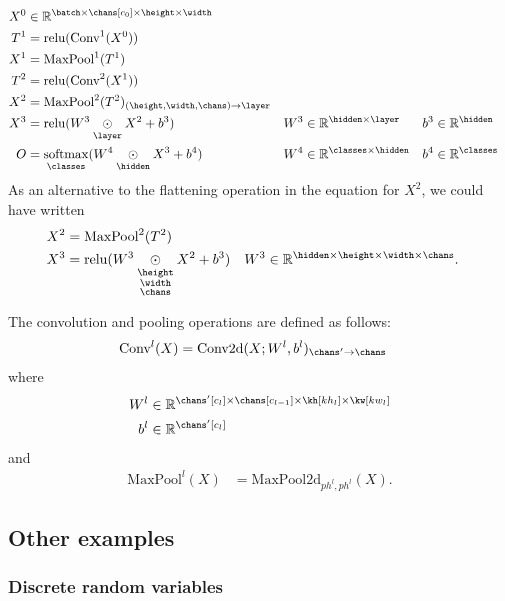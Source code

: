 \documentclass{article}
\newcommand{\reals}{\mathbb{R}}
\begin{document}
\begin{align*}
X^0 &\in \reals^{\batch \times \chans[c_0] \times \height \times \width} \\
T^1 &= \text{relu}(\text{Conv}^1(X^0)) \\
X^1 &= \text{MaxPool}^1(T^1) \\
T^2 &= \text{relu}(\text{Conv}^2(X^1)) \\
X^2 &= \text{MaxPool}^2(T^2)_{(\height,\width,\chans)\rightarrow\layer} \\
X^3 &= \text{relu}(W^3 \ndot{\layer} X^2 + b^3) & W^3 &\in \mathbb{R}^{\hidden \times \layer} & b^3 &\in \mathbb{R}^{\hidden} \\
O &= \nfun{\classes}{softmax} (W^4 \ndot{\hidden} X^3 + b^4) & W^4 &\in \mathbb{R}^{\classes \times \hidden} & b^4 &\in \mathbb{R}^{\classes}
\end{align*}
As an alternative to the flattening operation in the equation for $X^2$, we could have written
\begin{align*}
X^2 &= \text{MaxPool}^2(T^2) \\
X^3 &= \text{relu}(W^3 \ndot{\height \\ \width \\ \chans} X^2 + b^3) & W^3 &\in \mathbb{R}^{\hidden \times \height \times \width \times \chans}.
\end{align*}

The convolution and pooling operations are defined as follows:
\begin{align*}
\text{Conv}^l(X) &= \text{Conv2d}(X; W^l, b^l)_{\chans'\rightarrow\chans}
\end{align*}
where
\begin{align*}
W^l & \in \reals^{\chans'[c_l] \times \chans[c_{l-1}] \times \kh[kh_l] \times \kw[kw_l]} \\
b^l &\in \reals^{\chans'[c_l]}
\end{align*}
and
\begin{align*}
\text{MaxPool}^l(X) &= \text{MaxPool2d}_{ph^l,ph^l}(X).
\end{align*}

\subsection{Other examples}

\subsubsection{Discrete random variables}
\end{document}
